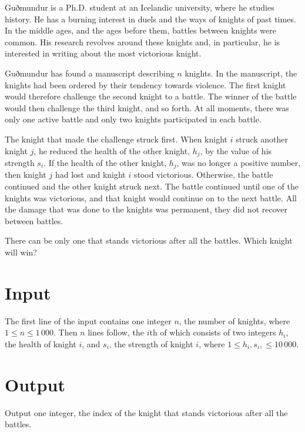 
Guðmundur is a Ph.D. student at an Icelandic university, where he studies history.
He has a burning interest in duels and the ways of knights of past times.
In the middle ages, and the ages before them, battles between knights were common.
His research revolves around these knights and, in particular, he is interested in writing about the most victorious knight.

Guðmundur has found a manuscript describing $n$ knights.
In the manuscript, the knights had been ordered by their tendency towards violence.
The first knight would therefore challenge the second knight to a battle.
The winner of the battle would then challenge the third knight, and so forth.
At all moments, there was only one active battle and only two knights participated in each battle.

The knight that made the challenge struck first.
When knight $i$ struck another knight $j$, he reduced the health of the other knight, $h_j$, by the value of his strength $s_i$.
If the health of the other knight, $h_j$, was no longer a positive number, then knight $j$ had lost and knight $i$ stood victorious.
Otherwise, the battle continued and the other knight struck next.
The battle continued until one of the knights was victorious, and that knight would continue on to the next battle.
All the damage that was done to the knights was permanent, they did not recover between battles.

There can be only one that stands victorious after all the battles.
Which knight will win?

\section*{Input}
The first line of the input contains one integer $n$, the number of knights, where $1 \leq n \leq 1\,000$.
Then $n$ lines follow, the $i$th of which consists of two integers $h_i$, the health of knight $i$, and $s_i$, the strength of knight $i$, where $1 \leq h_i, s_i, \leq 10\,000$.

\section*{Output}
Output one integer, the index of the knight that stands victorious after all the battles.
